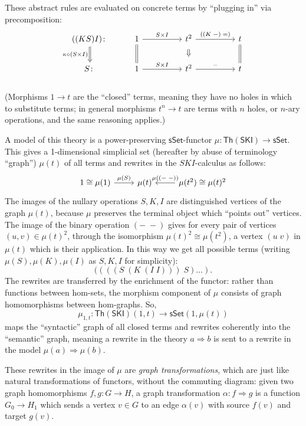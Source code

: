 \documentclass{amsart}
\theoremstyle{definition}
\newcommand{\sSet}{\mathsf{sSet}}
\newcommand{\Th}{\mathsf{Th}}
\newcommand{\maps}{\colon}
\begin{document}
These abstract rules are evaluated on concrete terms by ``plugging in'' via precomposition:
\[\begin{tikzcd}
	((KS)I)\maps \arrow[Rightarrow,d,swap,"\kappa \circ (S\times I)"] & 1 \arrow[d,equal] \arrow[rr,"S\times I"] && t^2 \arrow[Rightarrow,d,shorten >=0.2cm,shorten <=0.2cm] \arrow[rr,"((K\; -)\; =)"] && t \arrow[d,equal]\\
	S\maps & 1 \arrow[rr,"S\times I"] && t^2 \arrow[rr,"-"] && t
\end{tikzcd}\]\\
(Morphisms $1\to t$ are the ``closed'' terms, meaning they have no holes in which to substitute terms; in general morphisms $t^n\to t$ are terms with $n$ holes, or $n$-ary operations, and the same reasoning applies.)

A model of this theory is a power-preserving $\sSet$-functor $\mu\maps \Th(\mathsf{SKI}) \to \sSet$. This gives a 1-dimensional simplicial set (hereafter by abuse of terminology ``graph'') $\mu(t)$ of all terms and rewrites in the $SKI$-calculus as follows:
\[\begin{tikzcd}
1 \cong \mu(1) \arrow[r,"\mu(S)"] & \mu(t) & \mu(t^2) \arrow[l,swap,"\mu(\left(-\;-\right))"] \cong \mu(t)^2
\end{tikzcd}\]
The images of the nullary operations $S,K,I$ are distinguished vertices of the graph $\mu(t)$, because $\mu$ preserves the terminal object which ``points out'' vertices. The image of the binary operation $(-\; -)$ gives for every pair of vertices $(u,v) \in \mu(t)^2$, through the isomorphism $\mu(t)^2 \cong \mu(t^2)$, a vertex $(u\; v)$ in $\mu(t)$ which is their application. In this way we get all possible terms (writing $\mu(S),\mu(K),\mu(I)$ as $S,K,I$ for simplicity): 
\[  ((((S\; (K\; (I\; I)))\; S) \dots ). \]
The rewrites are transferred by the enrichment of the functor: rather than functions between hom-sets, the morphism component of $\mu$ consists of graph homomorphisms between hom-graphs. So, $$\mu_{1,t}\maps \Th(\mathsf{SKI})(1,t)\to \sSet(1,\mu(t))$$ maps the ``syntactic'' graph of all closed terms and rewrites coherently into the ``semantic'' graph, meaning a rewrite in the theory $a\Rightarrow b$ is sent to a rewrite in the model $\mu(a) \Rightarrow \mu(b)$.

These rewrites in the image of $\mu$ are \textit{graph transformations}, which are just like natural transformations of functors, without the commuting diagram: given two graph homomorphisms $f,g\maps G\to H$, a graph transformation $\alpha\maps f \Rightarrow g$ is a function $G_0\to H_1$ which sends a vertex $v\in G$ to an edge $\alpha(v)$ with source $f(v)$ and target $g(v)$.
\end{document}
